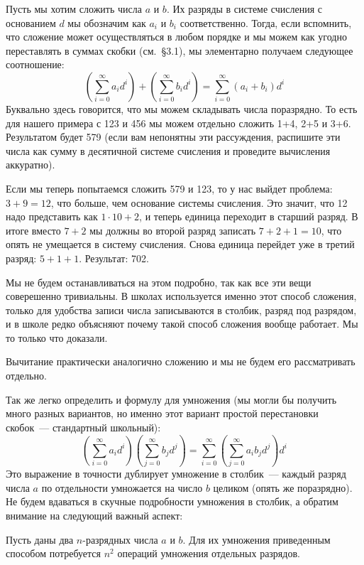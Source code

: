 Пусть мы хотим сложить числа $a$ и $b$. Их разряды в системе счисления с основанием $d$ мы обозначим как $a_i$ и $b_i$ соответственно. Тогда, если вспомнить, что сложение может осуществляться в любом порядке и мы можем как угодно переставлять в суммах скобки (см.~\S3.1), мы элементарно получаем следующее соотношение:
$$\left(\sum_{i=0}^\infty a_i d^i\right) + \left(\sum_{i=0}^\infty b_i d^i\right) = \sum_{i=0}^\infty (a_i + b_i) d^i$$
Буквально здесь говорится, что мы можем складывать числа поразрядно. То есть для нашего примера с 123 и 456 мы можем отдельно сложить 1+4, 2+5 и 3+6. Результатом будет 579 (если вам непонятны эти рассуждения, распишите эти числа как сумму в десятичной системе счисления и проведите вычисления аккуратно).

Если мы теперь попытаемся сложить 579 и 123, то у нас выйдет проблема: $3+9=12$, что больше, чем основание системы счисления. Это значит, что 12 надо представить как $1\cdot10 + 2$, и теперь единица переходит в старший разряд. В итоге вместо $7+2$ мы должны во второй разряд записать $7+2+1=10$, что опять не умещается в систему счисления. Снова единица перейдет уже в третий разряд: $5+1+1$. Результат: 702.

Мы не будем останавливаться на этом подробно, так как все эти вещи соверешенно тривиальны. В школах используется именно этот способ сложения, только для удобства записи числа записываются в столбик, разряд под разрядом, и в школе редко объясняют почему такой способ сложения вообще работает. Мы то только что доказали.

Вычитание практически аналогично сложению и мы не будем его рассматривать отдельно.

Так же легко определить и формулу для умножения (мы могли бы получить много разных вариантов, но именно этот вариант простой перестановки скобок~--- стандартный школьный):
$$\left(\sum_{i=0}^\infty a_i d^i \right)\left( \sum_{j=0}^\infty b_j d^j \right) = \sum_{i=0}^\infty \left(\sum_{j=0}^\infty a_i b_j d^j \right)d^i$$
Это выражение в точности дублирует умножение в столбик~--- каждый разряд числа $a$ по отдельности умножается на число $b$ целиком (опять же поразрядно). Не будем вдаваться в скучные подробности умножения в столбик, а обратим внимание на следующий важный аспект:

\begin{exercise}
Пусть даны два $n$-разрядных числа $a$ и $b$. Для их умножения приведенным способом потребуется $n^2$ операций умножения отдельных разрядов.
\end{exercise}

